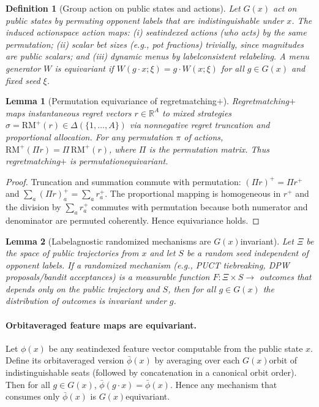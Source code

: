 \documentclass[10pt]{article}
\newcommand{\1}{\mathbf{1}}
\theoremstyle{plain}
\newtheorem{definition}{Definition}
\newtheorem{lemma}{Lemma}
\begin{document}
\begin{definition}[Group action on public states and actions]
Let $G(x)$ act on public states by permuting opponent labels that are indistinguishable under $x$. The induced action\textendash space action maps: (i) seat\textendash indexed actions (who acts) by the same permutation; (ii) scalar bet sizes (e.g., pot fractions) trivially, since magnitudes are public scalars; and (iii) dynamic menus by label\textendash consistent relabeling. A menu generator $W$ is \emph{equivariant} if $W(g\!\cdot\!x;\xi)=g\!\cdot W(x;\xi)$ for all $g\in G(x)$ and fixed seed $\xi$.
\end{definition}

\begin{lemma}[Permutation equivariance of regret\textendash matching$+$]
\label{lem:rmplus_equiv}
Regret\textendash matching$+$ maps instantaneous regret vectors $r\in\mathbb{R}^A$ to mixed strategies $\sigma=\mathrm{RM}^+(r)\in\Delta(\{1,\dots,A\})$ via nonnegative regret truncation and proportional allocation. For any permutation $\pi$ of actions, $\mathrm{RM}^+(\Pi r)=\Pi\,\mathrm{RM}^+(r)$, where $\Pi$ is the permutation matrix. Thus regret\textendash matching$+$ is permutation\textendash equivariant.
\end{lemma}
\begin{proof}
Truncation and summation commute with permutation: $(\Pi r)^+=\Pi r^+$ and $\sum_a (\Pi r)^+_a=\sum_a r^+_a$. The proportional mapping is homogeneous in $r^+$ and the division by $\sum_a r^+_a$ commutes with permutation because both numerator and denominator are permuted coherently. Hence equivariance holds.
\end{proof}

\begin{lemma}[Label\textendash agnostic randomized mechanisms are $G(x)$\textendash invariant]
\label{lem:rand_inv}
Let $\Xi$ be the space of public trajectories from $x$ and let $S$ be a random seed independent of opponent labels. If a randomized mechanism (e.g., PUCT tie\textendash breaking, DPW proposals/bandit acceptances) is a measurable function $F:\Xi\times S\to$ outcomes that depends only on the public trajectory and $S$, then for all $g\in G(x)$ the distribution of outcomes is invariant under $g$.
\end{lemma}

\paragraph{Orbit\textendash averaged feature maps are equivariant.}
Let $\phi(x)$ be any seat\textendash indexed feature vector computable from the public state $x$. Define its orbit\textendash averaged version $\bar\phi(x)$ by averaging over each $G(x)$\textendash orbit of indistinguishable seats (followed by concatenation in a canonical orbit order). Then for all $g\in G(x)$, $\bar\phi(g\!\cdot\!x)=\bar\phi(x)$. Hence any mechanism that consumes only $\bar\phi(x)$ is $G(x)$\textendash equivariant.
\end{document}
